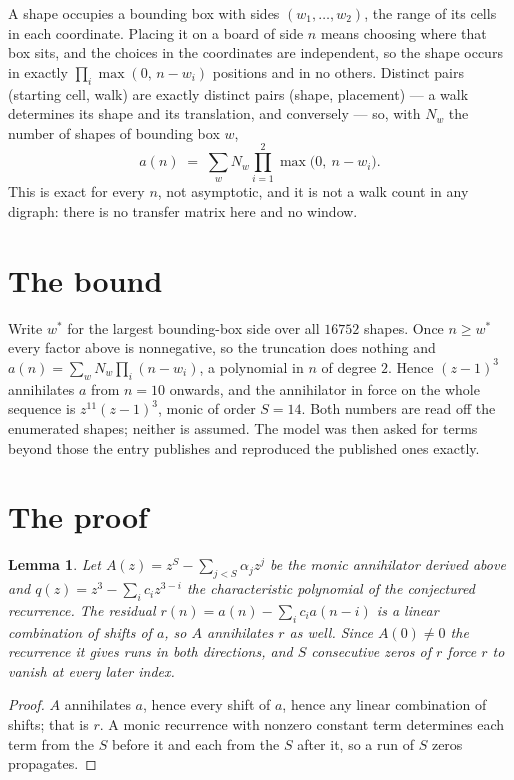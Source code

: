 \documentclass[11pt,a4paper]{article}
\theoremstyle{plain}
\newtheorem{lemma}[theorem]{Lemma}
\theoremstyle{definition}
\begin{document}
A shape occupies a bounding box with sides $(w_1,\dots,w_{2})$, the range of its cells in each
coordinate. Placing it on a board of side $n$ means choosing where that box sits, and the
choices in the coordinates are independent, so the shape occurs in exactly
$\prod_{i}\max(0,\,n-w_i)$ positions and in no others. Distinct pairs (starting cell,
walk) are exactly distinct pairs (shape, placement) --- a walk determines its shape and its
translation, and conversely --- so, with $N_w$ the number of shapes of bounding box $w$,
\[
a(n)\;=\;\sum_{w} N_w \prod_{i=1}^{2}\max\bigl(0,\ n-w_i\bigr).
\]
This is exact for every $n$, not asymptotic, and it is not a walk count in any digraph: there is
no transfer matrix here and no window.

\section{The bound}

Write $w^\ast$ for the largest bounding-box side over all $16752$ shapes. Once $n\ge w^\ast$
every factor above is nonnegative, so the truncation does nothing and
$a(n)=\sum_w N_w\prod_i(n-w_i)$, a polynomial in $n$ of degree $2$. Hence $(z-1)^{3}$
annihilates $a$ from $n=10$ onwards, and the annihilator in force on the whole sequence is
$z^{11}(z-1)^{3}$, monic of order $S=14$. Both numbers are read off the enumerated
shapes; neither is assumed. The model was then asked for terms beyond those the entry publishes
and reproduced the published ones exactly.

\section{The proof}

\begin{lemma}\label{lem:crit}
Let $A(z)=z^S-\sum_{j<S}\alpha_jz^{j}$ be the monic annihilator derived above and
$q(z)=z^{3}-\sum_ic_iz^{3-i}$ the characteristic polynomial of the conjectured
recurrence. The residual $r(n)=a(n)-\sum_ic_ia(n-i)$ is a linear combination of shifts of $a$,
so $A$ annihilates $r$ as well. Since $A(0)\ne0$ the recurrence it gives runs in both
directions, and $S$ consecutive zeros of $r$ force $r$ to vanish at every later index.
\end{lemma}

\begin{proof}
$A$ annihilates $a$, hence every shift of $a$, hence any linear combination of shifts; that is
$r$. A monic recurrence with nonzero constant term determines each term from the $S$ before it
and each from the $S$ after it, so a run of $S$ zeros propagates.
\end{proof}
\end{document}
